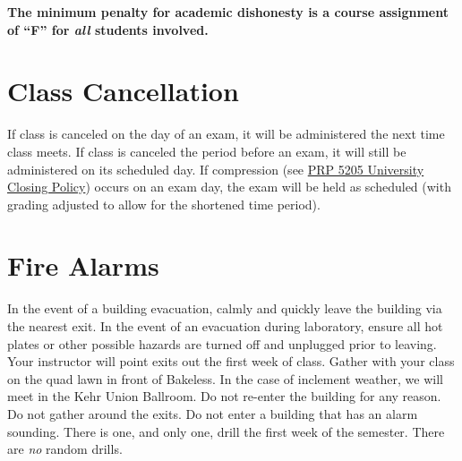 \documentclass[11pt,letterpaper]{article}
\begin{document}
\begin{mdframed}
	\centering\bfseries The minimum penalty for academic dishonesty is a
	course assignment of ``F'' for \emph{all} students involved.
\end{mdframed}

\section{Class Cancellation}
If class is canceled on the day of an exam, it will be administered the next
time class meets.  If class is canceled the period before an exam, it will
still be administered on its scheduled day. If compression
(see \href{https://www.bloomu.edu/documents/prp5205}{PRP 5205 University Closing
Policy})
occurs on an exam day, the exam will be held as scheduled (with
grading adjusted to allow for the shortened time period).

\section{Fire Alarms}
In the event of a building evacuation, calmly and quickly leave the building via
the nearest exit. In the event of an evacuation during laboratory, ensure all
hot plates or other possible hazards are turned off and unplugged prior to
leaving. Your instructor will point exits out the first week of class.  Gather
with your class on the quad lawn in front of Bakeless. In the case of inclement
weather, we will meet in the Kehr Union Ballroom. Do not re-enter the
building for any reason. Do not gather around the exits. Do not enter a
building that has an alarm sounding. There is one, and only one, drill the first
week of the semester. There are \emph{no} random drills.

%
\end{document}

